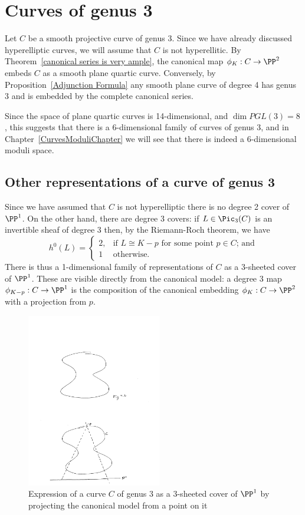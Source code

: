 \section{Curves of genus 3}

Let $C$ be a smooth projective curve of genus 3. Since we have already discussed hyperelliptic curves, 
we will assume  that $C$ is not hyperellitic. By  Theorem~\ref{canonical series is very ample}, the canonical map $\phi_K : C \to \PP^2$ embeds $C$ as a smooth plane quartic curve. Conversely, by Proposition~\ref{Adjunction Formula} any smooth plane curve of degree 4 has genus 3 and is embedded by the complete canonical series. 


Since the space of plane quartic curves is 14-dimensional, and $\dim PGL(3) = 8$, this suggests that
there is a 6-dimensional family of curves of genus 3, and in Chapter~\ref{CurvesModuliChapter}
we will see that there is indeed a 6-dimensional moduli space.

\subsection{Other representations of a curve of genus 3}\label{other genus 3}
Since we have assumed that $C$ is not hyperelliptic there is no degree 2 cover of $\PP^1$. On the other hand, there are degree 3 covers: if $L \in \Pic_3(C)$ is an invertible sheaf of degree 3 then, by the Riemann-Roch theorem, we have
$$
h^0(L) = 
\begin{cases}
2, &\text{if $L \cong K-p$ for some point $p \in C$; and} \\
1 &\text{otherwise.}
\end{cases}
$$
There is thus a 1-dimensional family of representations of $C$ as a 3-sheeted cover of $\PP^1$. These are  visible directly from the canonical model: a degree 3 map $\phi_{K-p} : C \to \PP^1$ is the composition of the canonical embedding $\phi_K : C \to \PP^2$ with a projection from $p$. 

\begin{figure}
 \caption{Expression of a curve $C$ of genus 3 as a 3-sheeted cover of $\PP^1$ by projecting the canonical model from a point on it}
\centerline {\includegraphics[height=3in]{"Fig5.2.pdf"}}
\end{figure}


